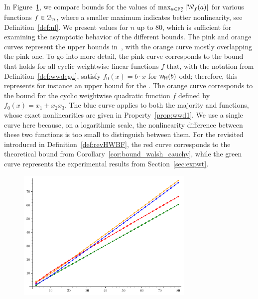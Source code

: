 \documentclass{llncs}
\begin{document}
In Figure~\ref{fig:walsh_bound_comparison}, we compare bounds for the values of $\max_{a \in \mathbb{F}_2^n} |\mathcal W_{f}(a)|$ for various functions $f\in\mathcal{B}_n$, where a smaller maximum indicates better nonlinearity, see Definition~\ref{def:nl}. We present values for $n$ up to $80$, which is sufficient for examining the asymptotic behavior of the different bounds. The pink and orange curves represent the upper bounds  in~\cite{DAM:MeaOza24}, with the orange curve mostly overlapping the pink one. To go into more detail, the pink curve corresponds to the bound that holds for all cyclic weightwise linear functions $f$ that, with the notation from Definition~\ref{def:wwdegd}, satisfy $ f_0(x) = b \cdot x $ for $\mathsf{w_H}(b)$ odd; therefore, this represents for instance an upper bound for the \hwbf{}. The orange curve corresponds to the bound for the cyclic weightwise quadratic function $f$ defined by $f_0(x) = x_1 + x_2 x_3$. The blue curve applies to both the majority and \hwbf{} functions, whose exact nonlinearities are given in Property~\ref{prop:wwd1}. We use a single curve here because, on a logarithmic scale, the nonlinearity difference between these two functions is too small to distinguish between them. For the revisited \hwbf{} introduced in Definition~\ref{def:revHWBF}, the red curve corresponds to the theoretical bound from Corollary~\ref{cor:bound_walsh_cauchy}, while the green curve represents the experimental results from Section~\ref{sec:expwt}.

\begin{figure}
	\centering
	\includegraphics[width=8.5cm]{comparison_walsh_bound.pdf}
	\label{fig:walsh_bound_comparison}
\end{figure}
\end{document}
